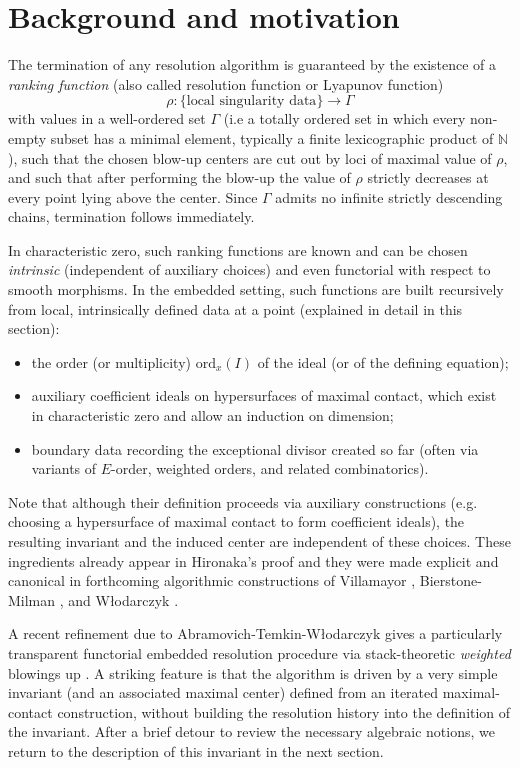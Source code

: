 \documentclass[11pt]{amsart}
\begin{document}
\section{Background and motivation}\label{sec:background}

The termination of any resolution algorithm is guaranteed by the existence of a \emph{ranking function} (also called resolution function or Lyapunov function)
\[
\rho : \{\text{local singularity data}\}\longrightarrow \Gamma
\]
with values in a well-ordered set $\Gamma$ (i.e a totally ordered set in which every non-empty subset has a minimal element, typically a finite lexicographic product of $\mathbb{N}$), such that the chosen blow-up centers are cut out by loci of
maximal value of $\rho$, and such that after performing the blow-up the value of $\rho$
strictly decreases at every point lying above the center.
Since $\Gamma$ admits no infinite strictly descending chains, termination follows immediately.

In characteristic zero, such ranking functions are known and can be chosen \emph{intrinsic} (independent of auxiliary
choices) and even functorial with respect to smooth morphisms.  In the embedded setting, such
functions are built recursively from local, intrinsically defined data at a point (explained in detail in this section):
\begin{itemize}
\item the order (or multiplicity) $\mathrm{ord}_x(I)$ of the ideal (or of the defining equation);
\item auxiliary coefficient ideals on hypersurfaces of maximal contact, which exist in characteristic zero and allow an induction on dimension;
\item boundary data recording the exceptional divisor created so far (often via variants of $E$-order,
weighted orders, and related combinatorics).
\end{itemize}
Note that although their definition proceeds via auxiliary constructions (e.g. choosing a hypersurface of maximal contact to form coefficient ideals), the resulting invariant and the induced center are independent of these choices. These ingredients already appear in Hironaka's proof \cite{Hironaka1964} and they were
made explicit and canonical in forthcoming algorithmic constructions of Villamayor \cite{Villamayor1989},
Bierstone-Milman \cite{BierstoneMilman1997}, and W\l odarczyk \cite{Wlodarczyk2005}.



A recent refinement due to Abramovich-Temkin-W\l odarczyk gives a particularly transparent
functorial embedded resolution procedure via stack-theoretic \emph{weighted} blowings up
\cite{AbramovichTemkinWlodarczyk2024,Abramovich2018ICM}.  A striking feature is that the algorithm is driven by a
very simple invariant (and an associated maximal center) defined from an iterated maximal-contact
construction, without building the resolution history into the definition of the invariant. After a brief detour to review the necessary algebraic notions, we return to the description of this invariant in the next section.
\end{document}
